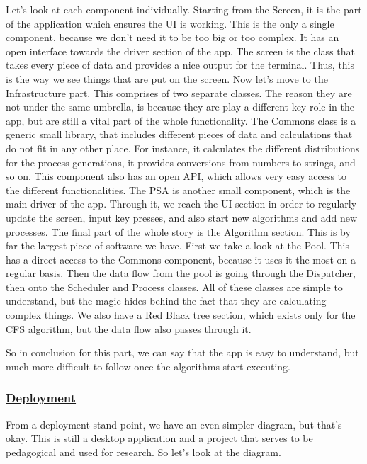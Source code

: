 \documentclass{article}
\begin{document}
Let's look at each component individually. Starting from the Screen, it is the part of the application which ensures the UI is working. This is the only a single component, because we don't need it to be too big or too complex. It has an open interface towards the driver section of the app. The screen is the class that takes every piece of data and provides a nice output for the terminal. Thus, this is the way we see things that are put on the screen. Now let's move to the Infrastructure part. This comprises of two separate classes. The reason they are not under the same umbrella, is because they are play a different key role in the app, but are still a vital part of the whole functionality. The Commons class is a generic small library, that includes different pieces of data and calculations that do not fit in any other place. For instance, it calculates the different distributions for the process generations, it provides conversions from numbers to strings, and so on. This component also has an open API, which allows very easy access to the different functionalities. The PSA is another small component, which is the main driver of the app. Through it, we reach the UI section in order to regularly update the screen, input key presses, and also start new algorithms and add new processes. The final part of the whole story is the Algorithm section. This is by far the largest piece of software we have. First we take a look at the Pool. This has a direct access to the Commons component, because it uses it the most on a regular basis. Then the data flow from the pool is going through the Dispatcher, then onto the Scheduler and Process classes. All of these classes are simple to understand, but the magic hides behind the fact that they are calculating complex things. We also have a Red Black tree section, which exists only for the CFS algorithm, but the data flow also passes through it.

So in conclusion for this part, we can say that the app is easy to understand, but much more difficult to follow once the algorithms start executing.

\subsubsection{\underline{Deployment}}

From a deployment stand point, we have an even simpler diagram, but that's okay. This is still a desktop application and a project that serves to be pedagogical and used for research. So let's look at the diagram.
\end{document}
